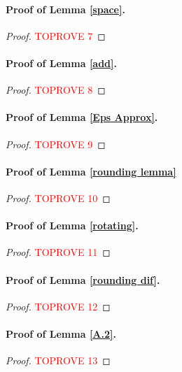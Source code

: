 \documentclass{article}
\theoremstyle{plain}
\begin{document}
\paragraph{Proof of Lemma \ref{space}.}
\begin{proof}\textcolor{red}{TOPROVE 7}\end{proof}

\paragraph{Proof of Lemma \ref{add}.}
\begin{proof}\textcolor{red}{TOPROVE 8}\end{proof}





\paragraph{Proof of Lemma \ref{Eps Approx}.}
\begin{proof}\textcolor{red}{TOPROVE 9}\end{proof}


\paragraph{Proof of Lemma \ref{rounding lemma}}


\begin{proof}\textcolor{red}{TOPROVE 10}\end{proof}


\paragraph{Proof of Lemma \ref{rotating}.}
\begin{proof}\textcolor{red}{TOPROVE 11}\end{proof}

\paragraph{Proof of Lemma \ref{rounding dif}.}
\begin{proof}\textcolor{red}{TOPROVE 12}\end{proof}


\paragraph{Proof of Lemma \ref{A.2}.}
\begin{proof}\textcolor{red}{TOPROVE 13}\end{proof}
\end{document}

